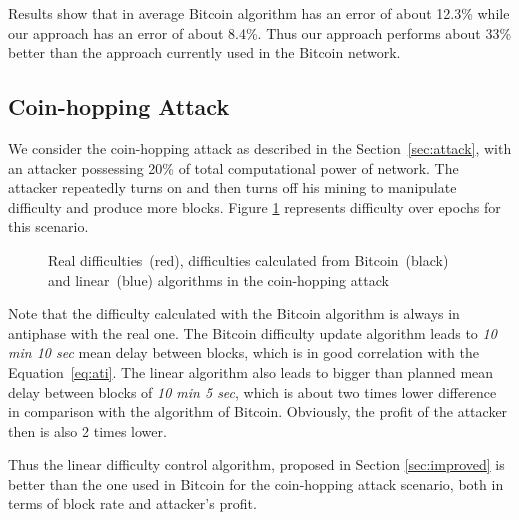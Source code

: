 \documentclass[]{llncs}
\newcommand{\attackname}{coin-hopping attack}
\newcommand{\AttackName}{Coin-hopping Attack}
\begin{document}
Results show that in average Bitcoin algorithm has an error of about 12.3\% while our approach has an error of about 8.4\%. Thus our approach performs about 33\% better than the approach currently used in the Bitcoin network.

\subsection{\AttackName}

We consider the \attackname{} as described in the Section~\ref{sec:attack}, with an attacker possessing 20\% of total computational power of network. The attacker repeatedly turns on and then turns off his mining to manipulate difficulty and produce more blocks.
Figure \ref{fig:attack} represents difficulty over epochs for this scenario.

\begin{figure}[h]
\caption{Real difficulties~(red), difficulties calculated from Bitcoin~(black) and linear~(blue) algorithms in the \attackname{}}
\label{fig:attack}
\end{figure}

Note that the difficulty calculated with the Bitcoin algorithm is always in antiphase with the real one.
The Bitcoin difficulty update algorithm leads to {\em 10 min 10 sec} mean delay between blocks, which is in good correlation with the Equation~\ref{eq:ati}.
The linear algorithm also leads to bigger than planned mean delay between blocks of {\em 10 min 5 sec}, which is about two times lower difference in comparison with the algorithm of Bitcoin. Obviously, the profit of the attacker then is also 2 times lower.

Thus the linear difficulty control algorithm, proposed in Section \ref{sec:improved} is better than the one used in Bitcoin for the \attackname{} scenario, both in terms of block rate and attacker's profit.

\newpage 



\end{document}
